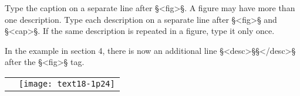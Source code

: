 \documentclass[fontsize=11pt, paper=a4, 
DIV15,
normalheadings,
parskip=half-, 
pointlessnumbers]{scrartcl}
\begin{document}
\begin{clarification}
Type the caption on a separate line after §<fig>§. A figure may have more than one description. Type each description on a separate line after §<fig>§ and §<cap>§. If the same description is repeated in a figure, type it only once.
\end{clarification}

\begin{note}
In the example in section 4, there is now an additional line §<desc>§§</desc>§ after the §<fig>§ tag.
\end{note}


\begin{tabular}{@{}ll}
\parbox[b]{8.3cm}{
 \\
\begin{typeLatin}
 \\
 \\
 \\
 \\
 \\
 \\
 \\
 \\
 \\
\end{typeLatin}} &
\texttt{[image: text18-1p24]}
\end{tabular}

\mehrzeilen
\end{document}
